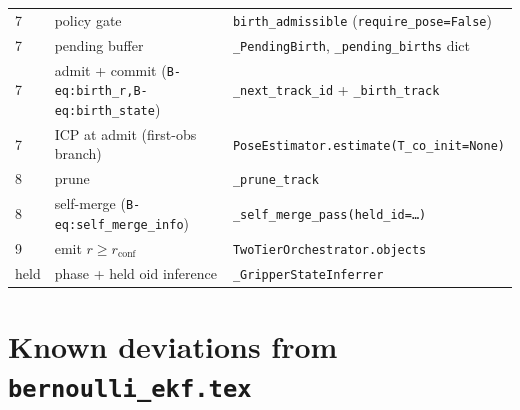\documentclass[11pt]{article}
\newcommand{\code}[1]{\texttt{\small #1}}
\begin{document}
\begin{center}
\begin{tabular}{lll}
7    & policy gate & \code{birth\_admissible} (\code{require\_pose=False}) \\
7    & pending buffer & \code{\_PendingBirth}, \code{\_pending\_births} dict \\
7    & admit + commit (\code{B-eq:birth\_r,B-eq:birth\_state}) & \code{\_next\_track\_id} + \code{\_birth\_track} \\
7    & ICP at admit (first-obs branch) & \code{PoseEstimator.estimate(T\_co\_init=None)} \\
8    & prune & \code{\_prune\_track} \\
8    & self-merge (\code{B-eq:self\_merge\_info}) & \code{\_self\_merge\_pass(held\_id=\dots)} \\
9    & emit $r\!\ge\!r_{\text{conf}}$ & \code{TwoTierOrchestrator.objects} \\
held & phase + held oid inference & \code{\_GripperStateInferrer} \\
\hline
\end{tabular}
\end{center}

\section{Known deviations from \code{bernoulli\_ekf.tex}}
\end{document}
